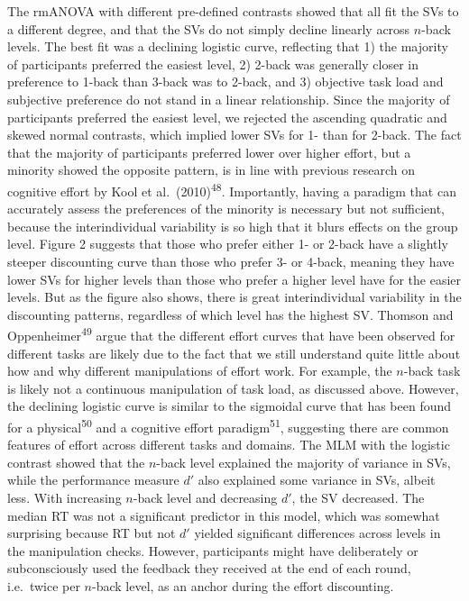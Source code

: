 \documentclass[
  man,floatsintext]{apa6}
\begin{document}
The rmANOVA with different pre-defined contrasts showed that all fit the SVs to a different degree, and that the SVs do not simply decline linearly across \(n\)-back levels.
The best fit was a declining logistic curve, reflecting that 1) the majority of participants preferred the easiest level, 2) 2-back was generally closer in preference to 1-back than 3-back was to 2-back, and 3) objective task load and subjective preference do not stand in a linear relationship.
Since the majority of participants preferred the easiest level, we rejected the ascending quadratic and skewed normal contrasts, which implied lower SVs for 1- than for 2-back.
The fact that the majority of participants preferred lower over higher effort, but a minority showed the opposite pattern, is in line with previous research on cognitive effort by Kool et al.~(2010)\textsuperscript{48}.
Importantly, having a paradigm that can accurately assess the preferences of the minority is necessary but not sufficient, because the interindividual variability is so high that it blurs effects on the group level.
Figure 2 suggests that those who prefer either 1- or 2-back have a slightly steeper discounting curve than those who prefer 3- or 4-back, meaning they have lower SVs for higher levels than those who prefer a higher level have for the easier levels.
But as the figure also shows, there is great interindividual variability in the discounting patterns, regardless of which level has the highest SV.
Thomson and Oppenheimer\textsuperscript{49} argue that the different effort curves that have been observed for different tasks are likely due to the fact that we still understand quite little about how and why different manipulations of effort work.
For example, the \(n\)-back task is likely not a continuous manipulation of task load, as discussed above.
However, the declining logistic curve is similar to the sigmoidal curve that has been found for a physical\textsuperscript{50} and a cognitive effort paradigm\textsuperscript{51}, suggesting there are common features of effort across different tasks and domains.
The MLM with the logistic contrast showed that the \(n\)-back level explained the majority of variance in SVs, while the performance measure \(d'\) also explained some variance in SVs, albeit less.
With increasing \(n\)-back level and decreasing \(d'\), the SV decreased.
The median RT was not a significant predictor in this model, which was somewhat surprising because RT but not \(d'\) yielded significant differences across levels in the manipulation checks.
However, participants might have deliberately or subconsciously used the feedback they received at the end of each round, i.e.~twice per \(n\)-back level, as an anchor during the effort discounting.
\end{document}
